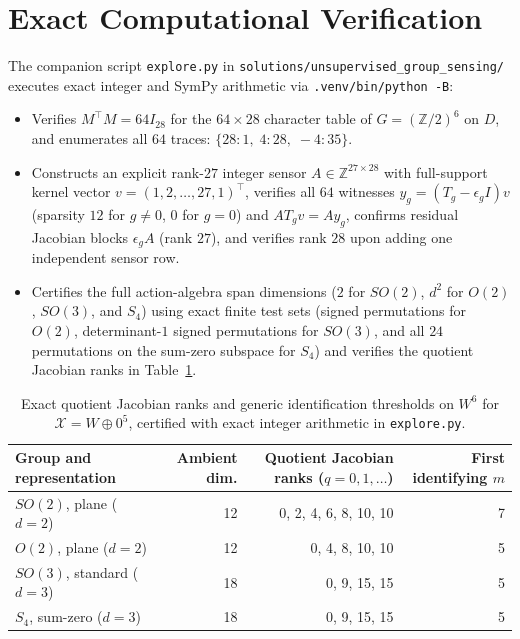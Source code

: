 \documentclass[11pt]{article}
\theoremstyle{plain}
\theoremstyle{definition}
\theoremstyle{remark}
\begin{document}
\section{Exact Computational Verification}

The companion script \texttt{explore.py} in \texttt{solutions/unsupervised\_group\_sensing/} executes exact integer and SymPy arithmetic via \texttt{.venv/bin/python -B}:
\begin{itemize}[leftmargin=2em,itemsep=1pt,topsep=3pt]
\item Verifies $M^\top M = 64 I_{28}$ for the $64 \times 28$ character table of $G = (\mathbb{Z}/2)^6$ on $D$, and enumerates all $64$ traces: $\{28: 1,\; 4: 28,\; -4: 35\}$.
\item Constructs an explicit rank-$27$ integer sensor $A \in \mathbb{Z}^{27 \times 28}$ with full-support kernel vector $v = (1, 2, \dots, 27, 1)^\top$, verifies all $64$ witnesses $y_g = (T_g - \epsilon_g I)v$ (sparsity $12$ for $g \neq 0$, $0$ for $g = 0$) and $A T_g v = A y_g$, confirms residual Jacobian blocks $\epsilon_g A$ (rank $27$), and verifies rank $28$ upon adding one independent sensor row.
\item Certifies the full action-algebra span dimensions ($2$ for $SO(2)$, $d^2$ for $O(2)$, $SO(3)$, and $S_4$) using exact finite test sets (signed permutations for $O(2)$, determinant-$1$ signed permutations for $SO(3)$, and all $24$ permutations on the sum-zero subspace for $S_4$) and verifies the quotient Jacobian ranks in Table~\ref{tab:subspace}.
\end{itemize}

\begin{table}[ht]
\centering
\small
\begin{tabular}{@{}lrrr@{}}
\toprule
Group and representation & Ambient dim. & Quotient Jacobian ranks ($q = 0, 1, \dots$) & First identifying $m$ \\
\midrule
$SO(2)$, plane ($d=2$)     & 12 & 0, 2, 4, 6, 8, 10, 10 & 7 \\
$O(2)$, plane ($d=2$)      & 12 & 0, 4, 8, 10, 10       & 5 \\
$SO(3)$, standard ($d=3$)  & 18 & 0, 9, 15, 15          & 5 \\
$S_4$, sum-zero ($d=3$)    & 18 & 0, 9, 15, 15          & 5 \\
\bottomrule
\end{tabular}
\caption{Exact quotient Jacobian ranks and generic identification thresholds on $W^6$ for $\mathcal{X} = W \oplus 0^5$, certified with exact integer arithmetic in \texttt{explore.py}.}
\label{tab:subspace}
\end{table}
\end{document}
